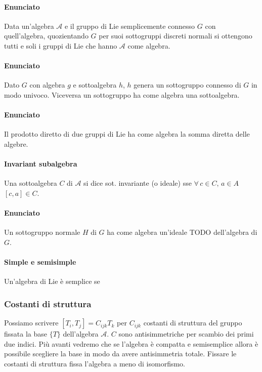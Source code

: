 \documentclass[12pt,oneside,notitlepage,abstracton,a4paper]{scrartcl}
\newcommand{\A}{\mathcal{A}}
\begin{document}
\paragraph{Enunciato} Data un'algebra $\A$ e il gruppo di Lie semplicemente connesso $G$ con quell'algebra, quozientando $G$ per suoi sottogruppi discreti normali si ottengono tutti e soli i gruppi di Lie che hanno $\A$ come algebra.
\paragraph{Enunciato} Dato $G$ con algebra $\mathit{g}$ e sottoalgebra $\mathit{h}$, $\mathit{h}$ genera un sottogruppo connesso di $G$ in modo univoco. Viceversa un sottogruppo ha come algebra una sottoalgebra.
\paragraph{Enunciato} Il prodotto diretto di due gruppi di Lie ha come algebra la somma diretta delle algebre.

\paragraph{Invariant subalgebra} Una sottoalgebra $C$ di $\A$ si dice sot. invariante (o ideale) sse $\forall\, c\in C,\, a\in A$ $[c,a] \in C$.

\paragraph{Enunciato} Un sottogruppo normale $H$ di $G$ ha come algebra un'ideale TODO dell'algebra di $G$.

\paragraph{Simple e semisimple} Un'algebra di Lie è semplice se 

\subsubsection{Costanti di struttura}
Possiamo scrivere $[T_i,T_j] = C_{ijk} T_k$ per $C_{ijk}$ costanti di struttura del gruppo fissata la base $\{T\}$ dell'algebra $\A$. $C$ sono antisimmetriche per scambio dei primi due indici. Più avanti vedremo che se l'algebra è compatta e semisemplice allora è possibile scegliere la base in modo da avere antisimmetria totale. Fissare le costanti di struttura fissa l'algebra a meno di isomorfismo.
\end{document}
